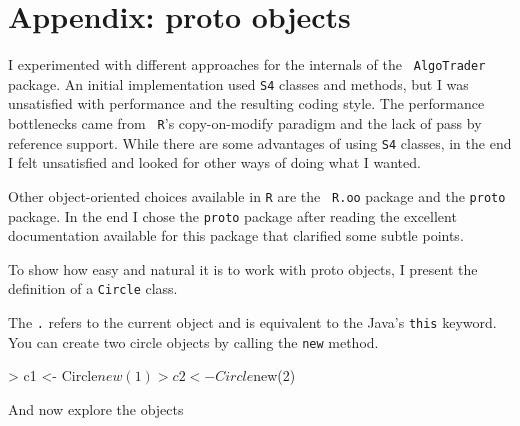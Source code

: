 \documentclass[nofootinbib]{revtex4}
\newcommand{\code}[1]{{\texttt{#1}}}
\begin{document}
\section{Appendix: proto objects}
\label{appendixProto}

I experimented with different approaches for the internals of the {\tt
  AlgoTrader} package.  An initial implementation used {\tt S4}
classes and methods, but I was unsatisfied with performance and the
resulting coding style.  The performance bottlenecks came from {\tt
  R}'s copy-on-modify paradigm and the lack of pass by reference
support.  While there are some advantages of using {\tt S4} classes,
in the end I felt unsatisfied and looked for other ways of doing what
I wanted.

Other object-oriented choices available in {\tt R} are the {\tt
  R.oo}\cite{Roo} package and the {\tt proto}\cite{proto} package.  In
the end I chose the {\tt proto} package after reading the excellent
documentation available for this package that clarified some subtle
points.

To show how easy and natural it is to work with proto objects, I
present the definition of a {\tt Circle} class.
\begin{Schunk}
\end{Schunk}
The \code{.} refers to the current object and is equivalent to the
Java's \code{this} keyword.  You can create two circle objects by
calling the {\tt new} method.
\begin{Schunk}
\begin{Sinput}
> c1 <- Circle$new(1)
> c2 <- Circle$new(2)
\end{Sinput}
\end{Schunk}
And now explore the objects
\begin{Schunk}
\end{Schunk}
\end{document}
